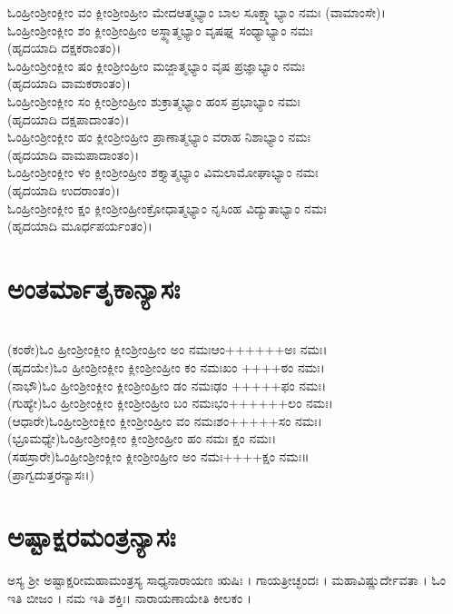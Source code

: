 ಓಂಹ್ರೀಂಶ್ರೀಂಕ್ಲೀಂ ವಂ ಕ್ಲೀಂಶ್ರೀಂಹ್ರೀಂ ಮೇದಆತ್ಮಭ್ಯಾಂ ಬಾಲ ಸೂಕ್ಷ್ಮಾಭ್ಯಾಂ ನಮಃ (ವಾಮಾಂಸೇ)।\\
ಓಂಹ್ರೀಂಶ್ರೀಂಕ್ಲೀಂ ಶಂ ಕ್ಲೀಂಶ್ರೀಂಹ್ರೀಂ ಅಸ್ಥ್ಯಾತ್ಮಭ್ಯಾಂ ವೃಷಘ್ನ ಸಂಧ್ಯಾಭ್ಯಾಂ ನಮಃ\\ (ಹೃದಯಾದಿ ದಕ್ಷಕರಾಂತಂ)।\\
ಓಂಹ್ರೀಂಶ್ರೀಂಕ್ಲೀಂ ಷಂ ಕ್ಲೀಂಶ್ರೀಂಹ್ರೀಂ ಮಜ್ಜಾತ್ಮಭ್ಯಾಂ ವೃಷ ಪ್ರಜ್ಞಾಭ್ಯಾಂ ನಮಃ \\(ಹೃದಯಾದಿ ವಾಮಕರಾಂತಂ)।\\
ಓಂಹ್ರೀಂಶ್ರೀಂಕ್ಲೀಂ ಸಂ ಕ್ಲೀಂಶ್ರೀಂಹ್ರೀಂ ಶುಕ್ರಾತ್ಮಭ್ಯಾಂ ಹಂಸ ಪ್ರಭಾಭ್ಯಾಂ ನಮಃ \\(ಹೃದಯಾದಿ ದಕ್ಷಪಾದಾಂತಂ)।\\
ಓಂಹ್ರೀಂಶ್ರೀಂಕ್ಲೀಂ ಹಂ ಕ್ಲೀಂಶ್ರೀಂಹ್ರೀಂ ಪ್ರಾಣಾತ್ಮಭ್ಯಾಂ ವರಾಹ ನಿಶಾಭ್ಯಾಂ ನಮಃ \\(ಹೃದಯಾದಿ ವಾಮಪಾದಾಂತಂ)।\\
ಓಂಹ್ರೀಂಶ್ರೀಂಕ್ಲೀಂ ಳಂ ಕ್ಲೀಂಶ್ರೀಂಹ್ರೀಂ ಶಕ್ತ್ಯಾತ್ಮಭ್ಯಾಂ ವಿಮಲಾಮೋಘಾಭ್ಯಾಂ ನಮಃ \\(ಹೃದಯಾದಿ ಉದರಾಂತಂ)।\\
ಓಂಹ್ರೀಂಶ್ರೀಂಕ್ಲೀಂ ಕ್ಷಂ ಕ್ಲೀಂಶ್ರೀಂಹ್ರೀಂಕ್ರೋಧಾತ್ಮಭ್ಯಾಂ ನೃಸಿಂಹ ವಿದ್ಯುತಾಭ್ಯಾಂ ನಮಃ \\(ಹೃದಯಾದಿ ಮೂರ್ಧಪರ್ಯಂತಂ)।
\newpage
 \section{ಅಂತರ್ಮಾತೃಕಾನ್ಯಾಸಃ}
\\
(ಕಂಠೇ)ಓಂ ಹ್ರೀಂಶ್ರೀಂಕ್ಲೀಂ ಕ್ಲೀಂಶ್ರೀಂಹ್ರೀಂ ಅಂ ನಮಃಆಂ++++++ಅಃ ನಮಃ।\\
(ಹೃದಯೇ)ಓಂ ಹ್ರೀಂಶ್ರೀಂಕ್ಲೀಂ ಕ್ಲೀಂಶ್ರೀಂಹ್ರೀಂ ಕಂ ನಮಃಖಂ ++++ಠಂ ನಮಃ।\\
(ನಾಭೌ)ಓಂ ಹ್ರೀಂಶ್ರೀಂಕ್ಲೀಂ ಕ್ಲೀಂಶ್ರೀಂಹ್ರೀಂ ಡಂ ನಮಃಢಂ +++++ಫಂ ನಮಃ।\\
(ಗುಹ್ಯೇ)ಓಂ ಹ್ರೀಂಶ್ರೀಂಕ್ಲೀಂ ಕ್ಲೀಂಶ್ರೀಂಹ್ರೀಂ ಬಂ ನಮಃಭಂ++++++ಲಂ ನಮಃ।\\
(ಆಧಾರೇ)ಓಂಹ್ರೀಂಶ್ರೀಂಕ್ಲೀಂ ಕ್ಲೀಂಶ್ರೀಂಹ್ರೀಂ ವಂ ನಮಃಶಂ+++++ಸಂ ನಮಃ।\\
(ಭ್ರೂಮಧ್ಯೇ)ಓಂಹ್ರೀಂಶ್ರೀಂಕ್ಲೀಂ ಕ್ಲೀಂಶ್ರೀಂಹ್ರೀಂ ಹಂ ನಮಃ ಕ್ಷಂ ನಮಃ।\\
(ಸಹಸ್ರಾರೇ)ಓಂಹ್ರೀಂಶ್ರೀಂಕ್ಲೀಂ ಕ್ಲೀಂಶ್ರೀಂಹ್ರೀಂ ಅಂ ನಮಃ++++ಕ್ಷಂ ನಮಃ॥\\(ಪ್ರಾಗ್ವದುತ್ತರನ್ಯಾಸಃ।)
\newpage
\section{ಅಷ್ಟಾಕ್ಷರಮಂತ್ರನ್ಯಾಸಃ}
ಅಸ್ಯ ಶ್ರೀ ಅಷ್ಟಾಕ್ಷರೀಮಹಾಮಂತ್ರಸ್ಯ ಸಾಧ್ಯನಾರಾಯಣ ಋಷಿಃ । ಗಾಯತ್ರೀಚ್ಛಂದಃ । ಮಹಾವಿಷ್ಣುರ್ದೇವತಾ । ಓಂ ಇತಿ ಬೀಜಂ । ನಮ ಇತಿ ಶಕ್ತಿಃ। ನಾರಾಯಣಾಯೇತಿ ಕೀಲಕಂ ।
